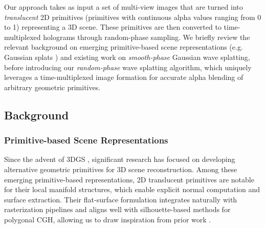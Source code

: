 Our approach takes as input a set of multi-view images that are turned into \textit{translucent} 2D primitives (primitives with continuous alpha values ranging from 0 to 1) representing a 3D scene. These primitives are then converted to time-multiplexed holograms through random-phase sampling. We briefly review the relevant background on emerging primitive-based scene representations (e.g. Gaussian splats \cite{kerbl3Dgaussians, huang20242d}) and existing work on \emph{smooth-phase} Gaussian wave splatting, before introducing our \emph{random-phase} wave splatting algorithm, which uniquely leverages a time-multiplexed image formation for accurate alpha blending of arbitrary geometric primitives. 


\subsection{Background}
\label{sec:background}

\subsubsection{Primitive-based Scene Representations}

Since the advent of 3DGS \cite{kerbl3Dgaussians}, significant research has focused on developing alternative geometric primitives for 3D scene reconstruction.
Among these emerging primitive-based representations, 2D translucent primitives are notable for their local manifold structures, which enable explicit normal computation and surface extraction. Their flat-surface formulation integrates naturally with rasterization pipelines and aligns well with silhouette-based methods for polygonal CGH, allowing us to draw inspiration from prior work \cite{matsushima2003fast, matsushima2005computer, matsushima2014silhouette, matsushima2020introduction}. 


